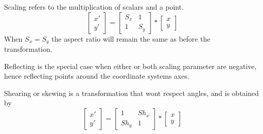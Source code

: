 Scaling refers to the multiplication of scalars and a point.
$$\begin{bmatrix}
	x' \\
	y'
\end{bmatrix}
=
\begin{bmatrix}
	S_{x} & 1 \\
	1 & S_{y}
\end{bmatrix}
*
\begin{bmatrix}
	x \\
	y
\end{bmatrix}$$
When $S_{x} = S_{y}$ the aspect ratio will remain the same as before the
transformation.

Reflecting is the special case when either or both scaling parameter are
negative, hence reflecting points around the coordinate systems axes.

Shearing or skewing is a transformation that wont respect angles, and is
obtained by
$$\begin{bmatrix}
	x' \\
	y'
\end{bmatrix}
=
\begin{bmatrix}
	1 & Sh_{x} \\
	Sh_{y} & 1
\end{bmatrix}
*
\begin{bmatrix}
	x \\
	y
\end{bmatrix}$$
